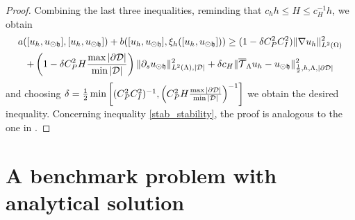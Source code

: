 \documentclass[r]{siamart171218}
\begin{document}
\begin{proof}
{%
Combining the last three inequalities, reminding that $c_h h\leq H \leq c_H^{-1}h$, 
we obtain
\begin{multline*}
a([u_h, u_{\odot \mathfrak{h}}],[u_h, u_{\odot \mathfrak{h}}] ) + b([u_h, u_{\odot \mathfrak{h}}], \xi_h([u_h, u_{\odot \mathfrak{h}}]))
\geq (1-\delta C_P^2 C_I^2) \|\nabla u_h\|^2_{L^2(\Omega)} 
\\
+ \left(1- \delta C_P^2 H \frac{\max |\partial\mathcal{D}|}{\min |\mathcal{D}|}\right) \|\partial_s u_{\odot \mathfrak{h}}\|^2_{L^2(\Lambda), |\mathcal{D}|}
+\delta c_H  \|{\overline{\mathcal{T}}_\Lambda} u_h-u_{\odot \mathfrak{h}}\|^2_{\frac 12,h,\Lambda, |\partial\mathcal{D}|}
\end{multline*}
and choosing $\delta=\frac{1}{2}\min\left[(C_P^2 C_I^2)^{-1}, \left(C_P^2 H \frac{\max |\partial\mathcal{D}|}{\min |\mathcal{D}|}\right)^{-1}\right]$ we obtain the desired inequality.
Concerning inequality \eqref{stab_stability}, the proof is analogous to the one in \cite{burman2014}.}
\end{proof}



\section{A benchmark problem with analytical solution}
\end{document}

